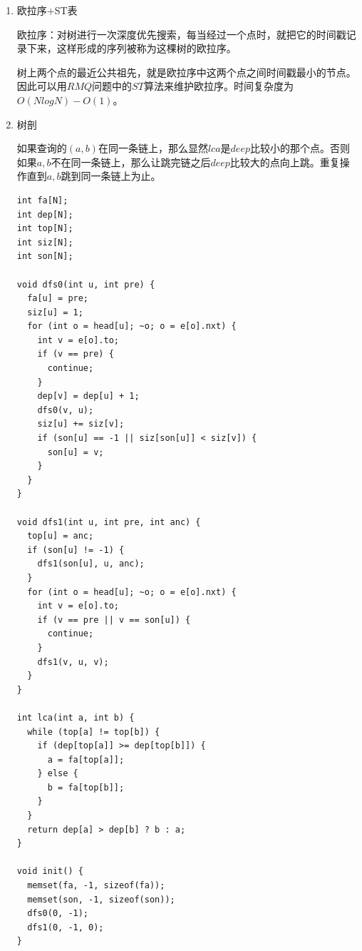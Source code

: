 \documentclass[11pt]{article}
\begin{document}
\begin{enumerate}
这是一个离线算法，时间复杂度为\(O(N\alpha(N))\)，约为\(O(N)\)。

\begin{verbatim}
const int N = 100000 + 5;
const int Q = 200000 + 5;

int s[N];
int lca[Q];
vector < pair <int, int> > q[N];

int get(int x) {
  return s[x] == x ? x : s[x] = get(s[x]);
}

void dfs(int u, int pre) {
  col[u] = 1;
  for (int o = head[u]; ~o; o = e[o].nxt) {
    int v = e[o].to;
    if (v == pre) {
      continue;
    }
    dfs(v, u);
    s[v] = u;
  }
  col[u] = 2;
  for (int i = 0; i < q[u].size(); ++i) {
    int v = q[u][i].first;
    if (col[v] == 2) {
      lca[q[u][i].second] = get(v);
    }
  }
}


int main() {
  for (int i = 0; i < n; ++i) {
    s[i] = i;
  }
  for (int i = 0; i < q; ++i) {
    int x = read() - 1;
    int y = read() - 1;
    q[x].push_back(make_pair(y, i));
    q[y].push_back(make_pair(x, i));
  }
  dfs(0, -1);
  return 0;
}
\end{verbatim}
\item 欧拉序+ST表
\label{sec:org8e088db}

欧拉序：对树进行一次深度优先搜索，每当经过一个点时，就把它的时间戳记录下来，这样形成的序列被称为这棵树的欧拉序。

树上两个点的最近公共祖先，就是欧拉序中这两个点之间时间戳最小的节点。因此可以用\(RMQ\)问题中的\(ST\)算法来维护欧拉序。时间复杂度为\(O(NlogN)-O(1)\)。

\item 树剖
\label{sec:orgd2fa5f4}

如果查询的\((a,b)\)在同一条链上，那么显然\(lca\)是\(deep\)比较小的那个点。否则如果\(a,b\)不在同一条链上，那么让跳完链之后\(deep\)比较大的点向上跳。重复操作直到\(a,b\)跳到同一条链上为止。

\begin{verbatim}
int fa[N];
int dep[N];
int top[N];
int siz[N];
int son[N];

void dfs0(int u, int pre) {
  fa[u] = pre;
  siz[u] = 1;
  for (int o = head[u]; ~o; o = e[o].nxt) {
    int v = e[o].to;
    if (v == pre) {
      continue;
    }
    dep[v] = dep[u] + 1;
    dfs0(v, u);
    siz[u] += siz[v];
    if (son[u] == -1 || siz[son[u]] < siz[v]) {
      son[u] = v;
    }
  }
}

void dfs1(int u, int pre, int anc) {
  top[u] = anc;
  if (son[u] != -1) {
    dfs1(son[u], u, anc);
  }
  for (int o = head[u]; ~o; o = e[o].nxt) {
    int v = e[o].to;
    if (v == pre || v == son[u]) {
      continue;
    }
    dfs1(v, u, v);
  }
}

int lca(int a, int b) {
  while (top[a] != top[b]) {
    if (dep[top[a]] >= dep[top[b]]) {
      a = fa[top[a]];
    } else {
      b = fa[top[b]];
    }
  }
  return dep[a] > dep[b] ? b : a;
}

void init() {
  memset(fa, -1, sizeof(fa));
  memset(son, -1, sizeof(son));
  dfs0(0, -1);
  dfs1(0, -1, 0);
}
\end{verbatim}
\end{enumerate}
\end{document}
